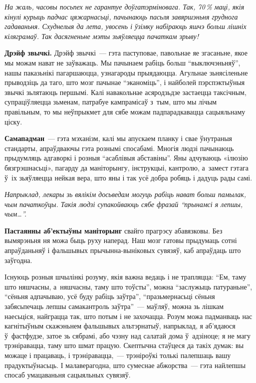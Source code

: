 \emph{На жаль, часовы посьпех не гарантуе доўгатэрміновага. Так, 70\,\% маці, якія кінулі курыць падчас цяжарнасьці, пачынаюць пасьля завяршэньня груднога гадаваньня. Схуднелыя да лета, увосень і ўзімку набіраюць яшчэ больш лішніх кіляграмаў. Так дасягненьне мэты зьяўляецца пачаткам зрыву!}

\textbf{Дрэйф звычкі.} Дрэйф звычкі~--- гэта паступовае, павольнае яе згасаньне, якое мы можам нават не заўважаць. Мы пачынаем рабіць больш ``выключэньняў'', нашы паказьнікі пагаршаюцца, узнагароды прыядаюцца. Агульнае зьнясіленьне прыводзіць да таго, што мозг пачынае ``эканоміць'', і найболей пэрспэктыўныя звычкі зьлятаюць першымі. Калі навакольнае асяродзьдзе застаецца таксічным, супраціўляецца зьменам, патрабуе кампрамісаў з~тым, што мы лічым правільным, то мы неўпрыкмет для сябе можам падпарадкавацца сацыяльнаму ціску.

\textbf{Самападман}~--- гэта мэханізм, калі мы апускаем планку і свае ўнутраныя стандарты, апраўдваючы гэта рознымі спосабамі. Многія людзі пачынаюць прыдумляць адгаворкі і розныя ``асаблівыя абставіны''. Яны адчуваюць «ілюзію бязгрэшнасьці», пагарду да маніторынгу, інструкцыі, кантролю, а~замест гэтага ў~іх зьяўляецца нейкая вера, што яны і так усё добра робяць і дадуць рады самі.

\emph{Напрыклад, лекары зь вялікім досьведам могуць рабіць нават больш памылак, чым пачаткоўцы. Такія людзі супакойваюць сябе фразай ``прынамсі я лепшы, чым…''.}

\textbf{Пастаянны аб'ектыўны маніторынг} свайго прагрэсу абавязковы. Без вымярэньня ня можа быць руху наперад. Наш мозг гатовы прыдумаць сотні апраўданьняў і фальшывых прычынна-выніковых сувязяў, каб апраўдаць што заўгодна. 


Існуюць розныя шчылінкі розуму, якія важна ведаць і не трапляцца: ``Ем, таму што няшчасны, а~няшчасны, таму што тоўсты'', можна ``заслужыць патураньне'', ``сёньня адпачываю, усё буду рабіць заўтра'', ``празьмернасьці сёньня забясьпечаць лепшы самакантроль заўтра''~--- маўляў, можна зь лішкам наесьціся, найграцца так, што потым і не захочацца. Розум можа падманваць нас кагнітыўным скажэньнем фальшывых альтэрнатыў, напрыклад, я аб'ядаюся ў~фастфудзе, затое зь сябрамі, або чэзну над салатай дома ў~адзіноце; я не магу трэніравацца, таму што шмат працую. Скептычна стаўцеся да такіх думак: вы можаце і працаваць, і трэніравацца,~--- трэніроўкі толькі палепшаць вашу прадуктыўнасьць. І малаверагодна, што сумеснае абжорства~--- гэта найлепшы спосаб умацаваньня сацыяльных сувязяў.

